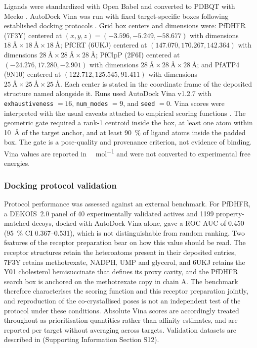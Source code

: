 \documentclass[journal=jcisd8,manuscript=article]{achemso}
\begin{document}
Ligands were standardized with Open Babel \cite{OBoyle2011} and converted to PDBQT with Meeko \cite{Eberhardt2021}. AutoDock Vina was run with fixed target-specific boxes following established docking protocols \cite{Trott2009}. Grid box centers and dimensions were: PfDHFR (7F3Y) centered at $(x,y,z) = (\num{-3.596}, \num{-5.249}, \num{-58.677})$ with dimensions $\SI{18}{\angstrom} \times \SI{18}{\angstrom} \times \SI{18}{\angstrom}$; PfCRT (6UKJ) centered at $(\num{147.070}, \num{170.267}, \num{142.364})$ with dimensions $\SI{28}{\angstrom} \times \SI{28}{\angstrom} \times \SI{28}{\angstrom}$; PfClpP (2F6I) centered at $(\num{-24.276}, \num{17.280}, \num{-2.901})$ with dimensions $\SI{28}{\angstrom} \times \SI{28}{\angstrom} \times \SI{28}{\angstrom}$; and PfATP4 (9N10) centered at $(\num{122.712}, \num{125.545}, \num{91.411})$ with dimensions $\SI{25}{\angstrom} \times \SI{25}{\angstrom} \times \SI{25}{\angstrom}$. Each center is stated in the coordinate frame of the deposited structure named alongside it. Runs used AutoDock Vina v1.2.7 with \texttt{exhaustiveness} $=\num{16}$, \texttt{num\_modes} $=\num{9}$, and \texttt{seed} $=\num{0}$. Vina scores were interpreted with the usual caveats attached to empirical scoring functions \cite{Quiroga2016}. The geometric gate required a rank-1 centroid inside the box, at least one atom within \qty{10}{\angstrom} of the target anchor, and at least \qty{90}{\percent} of ligand atoms inside the padded box. The gate is a pose-quality and provenance criterion, not evidence of binding. Vina values are reported in \si{\kilo\calorie\per\mole} and were not converted to experimental free energies.

\subsubsection{Docking protocol validation}
Protocol performance was assessed against an external benchmark. For PfDHFR, a DEKOIS~2.0 panel of \num{40} experimentally validated actives and \num{1199} property-matched decoys, docked with AutoDock Vina alone, gave a ROC-AUC of \num{0.450} (\qty{95}{\percent} CI \numrange{0.367}{0.531}), which is not distinguishable from random ranking. Two features of the receptor preparation bear on how this value should be read. The receptor structures retain the heteroatoms present in their deposited entries, 7F3Y retains methotrexate, NADPH, UMP and glycerol, and 6UKJ retains the Y01 cholesterol hemisuccinate that defines its proxy cavity, and the PfDHFR search box is anchored on the methotrexate copy in chain A. The benchmark therefore characterises the scoring function and this receptor preparation jointly, and reproduction of the co-crystallised poses is not an independent test of the protocol under these conditions. Absolute Vina scores are accordingly treated throughout as prioritisation quantities rather than affinity estimates, and are reported per target without averaging across targets. Validation datasets are described in  (Supporting Information Section S12).
\end{document}
